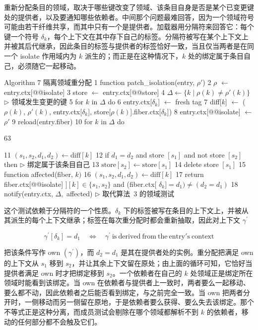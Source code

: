 \documentclass[
  10
]{article}
\begin{document}
重新分配条目的领域，取决于哪些键改变了领域、该条目自身是否是某个已变更键处的提供者，以及要通知哪些依赖者。中间那个问题最难回答，因为一个领域符号可能由若干纤维共享，而其中只有一个是提供者。加载器用分隔符来回答它：每个键一个符号 \(\delta _ { k }\)，每个上下文在其中存下自己的标签。分隔符被写在某个上下文上并被其后代继承，因此条目的标签与提供者的标签恰好一致，当且仅当两者是在同一个 isolate 作用域内为 \(k\) 派生的；而正是在这种情况下，\(k\) 处的绑定属于条目自己，必须随它一起移动。

Algorithm 7 隔离领域重分配 1 function
patch\_isolation(entry, $\rho'$) 2 $\rho$ $\leftarrow$ entry.ctx{[}@@isolate{]} 3 store $\leftarrow$
entry.ctx{[}@@store{]} 4 $\Delta \leftarrow \{ k \mid \rho(k) \neq \rho'(k) \}$ $\triangleright$ 领域发生变更的键 5 for $k$ in $\Delta$ do 6 entry.ctx{[}$\delta _ { k }${]} $\leftarrow$ fresh tag 7
diff{[}$k${]} $\leftarrow$ ($\rho(k)$, $\rho'(k)$, entry.ctx{[}$\delta _ { k }${]},
store{[}$\rho(k)${]}.fiber.ctx{[}$\delta _ { k }${]}) 8 entry.ctx{[}@@isolate{]} $\leftarrow$ $\rho'$ 9
reload(entry.fiber) 10 for $k$ in $\Delta$ do

63

11
\(( s _ { 1 } , s _ { 2 } , d _ { 1 } , d _ { 2 } ) \leftarrow \mathrm { d i f f } [ k ]\)
12 if \(d _ { 1 } = d _ { 2 }\) and store \(\left[ s _ { 1 } \right]\)
and not store \(\left[ s _ { 2 } \right]\) then \(\triangleright\) 绑定属于该条目自己 13
\(\mathrm { s t o r e } [ s _ { 2 } ] \gets \mathrm { s t o r e } [ s _ { 1 } ]\)
14 delete store \(\left[ s _ { 1 } \right]\) 15 function affected(fiber,
\(k)\) 16
\(( s _ { 1 } , s _ { 2 } , d _ { 1 } , d _ { 2 } ) \leftarrow \mathrm { d i f f } [ k ]\)
17 return fiber.ctx{[}@@isolate{]}
\(] [ k ] \in \{ s _ { 1 } , s _ { 2 } \}\) and (fiber.ctx{[}
\(\delta _ { k } ] = d _ { 1 } ) \neq ( d _ { 2 } = d _ { 1 } )\)
18 notify(entry.ctx, \(\Delta ,\) affected) $\triangleright$ 取代算法~3 的领域测试

这个测试依赖于分隔符的一个性质。\(\delta _ { k }\) 下的标签被写在条目的上下文上，并被从其派生的每个上下文继承；标签在每次重分配时都会重新抽取，因此对上下文 \(\gamma ^ { \prime }\)

\[
\gamma ^ { \prime } [ \delta _ { k } ] = d _ { 1 } \quad \Longleftrightarrow \quad \gamma ^ { \prime } { \mathrm { ~ i s ~ d e r i v e d ~ f r o m ~ t h e ~ e n t r y ' s ~ c o n t e x t } }\tag{65}
\]

把该条件写作 own \((\gamma ^ { \prime })\)，而 \(d _ { 2 } = d _ { 1 }\) 是其在提供者处的实例。重分配把满足 own 的上下文从 \(s _ { 1 }\) 移到 \(s _ { 2 }\)，并让其余上下文留在原处；由上面的循环可知，它恰好当提供者满足 own 时才把绑定移到 \(s _ { 2 }\)。一个依赖者在自己的 \(k\) 处领域正是绑定所在领域时能看到该绑定。当 own 在依赖者与提供者上一致时，两者要么一起移动、要么都不动，因此依赖者之后能否看到绑定，与之前完全一致。当 own 把两者分开时，一侧移动而另一侧留在原地，于是依赖者要么获得、要么失去该绑定。那个不等式正是这种分离，而成员测试会剔除在哪个领域都解析不到 \(k\) 的依赖者，移动的任何部分都不会触及它们。
\end{document}
